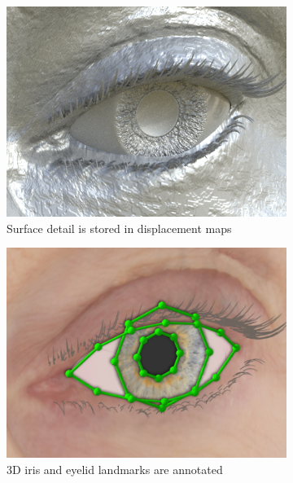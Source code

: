 \begin{figure}
\begin{subfigure}[t]{0.195\textwidth}
        \includegraphics[width=\textwidth]{process_f02_03}
        \caption{Surface detail is stored in displacement maps}
        \label{fig:process_displaced_subdiv}
    \end{subfigure}
    \hfill
    \begin{subfigure}[t]{0.195\textwidth}
        \includegraphics[width=\textwidth]{process_f02_04}
        \caption{3D iris and eyelid landmarks are annotated}
    \end{subfigure}
    \hfill
    \begin{subfigure}[t]{0.195\textwidth}

\end{subfigure}
\end{figure}
